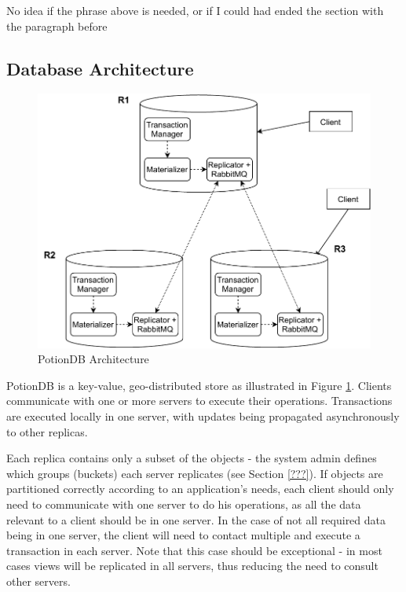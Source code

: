 \documentclass{vldb}
\newcommand{\grumbler}[2]{{\color{red}{\bf #1:} #2}}
\newcommand{\andre}[1]{\grumbler{andre}{#1}}
\begin{document}
\andre{No idea if the phrase above is needed, or if I could had ended the section with the paragraph before}


%
%


\subsection{Database Architecture} 

\begin{figure}
	\centering
	\includegraphics[width=.95\linewidth]{potiondb_architecture}
	\caption{PotionDB Architecture}
	\label{fig:potiondbArch}
\end{figure}

PotionDB is a key-value, geo-distributed store as illustrated in Figure \ref{fig:potiondbArch}.
Clients communicate with one or more servers to execute their operations.
Transactions are executed locally in one server, with updates being propagated asynchronously to other replicas.

Each replica contains only a subset of the objects - the system admin defines which groups (buckets) each server replicates (see Section \ref{???}).
If objects are partitioned correctly according to an application's needs, each client should only need to communicate with one server to do his operations, as all the data relevant to a client should be in one server.
In the case of not all required data being in one server, the client will need to contact multiple and execute a transaction in each server.
Note that this case should be exceptional - in most cases views will be replicated in all servers, thus reducing the need to consult other servers.
\end{document}
